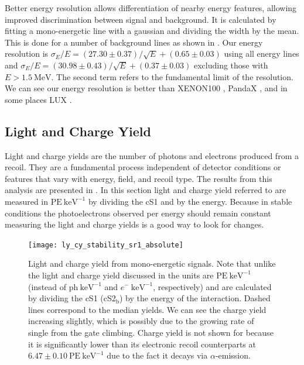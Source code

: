 Better energy resolution
allows differentiation of nearby energy features, allowing improved discrimination between signal and background.  It is calculated
by fitting a mono-energetic \gammaray line with a gaussian and dividing the width by the mean.  This is done for a number of background
lines as shown in .  Our energy resolution
is $\sigma_E / E = (27.30 \pm 0.37) / \sqrt{E} + (0.65 \pm 0.03)$ using all energy lines and
$\sigma_E / E = (30.98 \pm 0.43) / \sqrt{E} + (0.37 \pm 0.03)$ excluding those with $E > 1.5\ \mathrm{MeV}$.  The second term refers to
the fundamental limit of the resolution.  We can see our energy resolution is better than XENON100 , PandaX
, and in some places LUX .



\subsection{Light and Charge Yield}
\label{subsec:det_char_ly_cy}
Light and charge yields are the number of photons and electrons produced from a recoil.  They are a fundamental process independent of
detector conditions or features that vary with energy, field, and recoil type.  The results from this analysis are presented in
.  In this section light and charge yield referred to are measured in
$\mathrm{PE\ keV^{-1}}$ by dividing the cS1 and \cstwob by the energy.  Because in stable conditions the photoelectrons
observed per energy should remain constant measuring the light and charge yields is a good way to look for changes.

\begin{figure}
\centering
\texttt{[image: ly\_cy\_stability\_sr1\_absolute]}
\caption{Light and charge yield from mono-energetic signals.  Note that unlike the light and charge yield discussed in
 the units are $\mathrm{PE\ keV^{-1}}$ (instead of $\mathrm{ph\ keV^{-1}}$ and
$e^-\ \mathrm{keV^{-1}}$, respectively) and are calculated by dividing the cS1 (cS2$_{\mathrm{b}}$) by the energy of the
interaction.  Dashed lines correspond to the median yields.  We can see the charge yield increasing slightly, which is possibly due to
the growing rate of single \electron from the gate climbing.  Charge yield is not shown for  because it is significantly
lower than its
electronic recoil counterparts at $6.47 \pm 0.10\ \mathrm{PE\ keV^{-1}}$ due to the fact it decays via $\alpha$-emission.}
\label{fig:det_char_ly_cy_ly_cy}
\end{figure}

